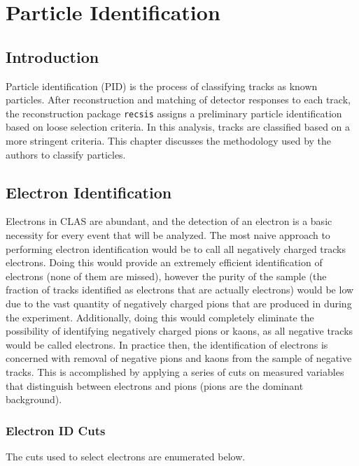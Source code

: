 
\chapter{Particle Identification}

\section{Introduction}
Particle identification (PID) is the process of classifying tracks as known particles.  After reconstruction and matching of detector responses to each track, the reconstruction package \texttt{recsis} assigns a preliminary particle identification based on loose selection criteria.  In this analysis, tracks are classified based on a more stringent criteria.  This chapter discusses the methodology used by the authors to classify particles.  

\section{Electron Identification}
Electrons in CLAS are abundant, and the detection of an electron is a basic necessity for every event that will be analyzed.  The most naive approach to performing electron identification would be to call all negatively charged tracks electrons.  Doing this would provide an extremely efficient identification of electrons (none of them are missed), however the purity of the sample (the fraction of tracks identified as electrons that are actually electrons) would be low due to the vast quantity of negatively charged pions that are produced in during the experiment.  Additionally, doing this would completely eliminate the possibility of identifying negatively charged pions or kaons, as all negative tracks would be called electrons.  In practice then, the identification of electrons is concerned with removal of negative pions and kaons from the sample of negative tracks.  This is accomplished by applying a series of cuts on measured variables that distinguish between electrons and pions (pions are the dominant background).

\subsection{Electron ID Cuts}
The cuts used to select electrons are enumerated below.

